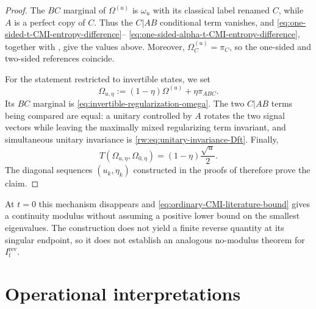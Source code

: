 \documentclass[11pt]{article}
\theoremstyle{remark}
\DeclareMathOperator{\rev}{rev}
\newcommand{\1}{\mathbbm{1}}
\begin{document}
\begin{proof}
The $BC$ marginal of $\Omega^{(u)}$ is $\omega_u$ with its classical
label renamed $C$, while $A$ is a perfect copy of $C$.  Thus the
$C|AB$ conditional term vanishes, and
\eqref{eq:one-sided-t-CMI-entropy-difference}--%
\eqref{eq:one-sided-alpha-t-CMI-entropy-difference}, together with
,
give the values above.  Moreover, $\Omega_C^{(u)}=\pi_C$, so the
one-sided and two-sided references coincide.

For the statement restricted to invertible states, we set
\begin{equation}
 \Omega_{u,\eta}:=(1-\eta)\Omega^{(u)}+\eta\pi_{ABC}.
 \label{eq:invertible-tripartite-regularization}
\end{equation}
Its $BC$ marginal is \eqref{eq:invertible-regularization-omega}.  The
two $C|AB$ terms being compared are equal: a unitary controlled by
$A$ rotates the two signal vectors while leaving the maximally mixed
regularizing term invariant, and simultaneous unitary invariance is
\eqref{rw:eq:unitary-invariance-Dft}.  Finally,
\begin{equation}
 T(\Omega_{u,\eta},\Omega_{0,\eta})
 =(1-\eta)\frac{\sqrt u}{2}.
\end{equation}
The diagonal sequences $(u_k,\eta_k)$ constructed in the proofs of
therefore prove the claim.
\end{proof}

At $t=0$ this mechanism disappears and
\eqref{eq:ordinary-CMI-literature-bound} gives a continuity modulus
without assuming a positive lower bound on the smallest eigenvalues.
The construction does not yield a finite reverse quantity at its
singular endpoint, so it does not establish an analogous no-modulus
theorem for $I_t^{\rev}$.


\section{Operational interpretations}
\label{sec:operational-interpretations}
\end{document}
